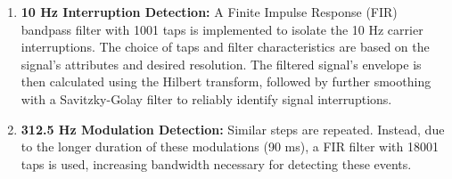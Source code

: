 \documentclass[12pt, a4paper]{extarticle}
\begin{document}
\begin{enumerate}[noitemsep]
    \item \textbf{10 Hz Interruption Detection:} A Finite Impulse Response
        (FIR) bandpass filter with 1001 taps is implemented to isolate the 10
        Hz carrier interruptions. The choice of taps and filter characteristics
        are based on the signal's attributes and desired resolution. The
        filtered signal's envelope is then calculated using the Hilbert
        transform, followed by further smoothing with a Savitzky-Golay filter
        to reliably identify signal interruptions.
    \item \textbf{312.5 Hz Modulation Detection:} Similar steps are repeated.
        Instead, due to the longer duration of these modulations (90 ms), a FIR
        filter with 18001 taps is used, increasing bandwidth necessary for
        detecting these events.
\end{enumerate}
\end{document}
